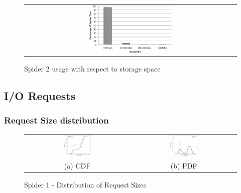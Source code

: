 \begin{figure}[!thb]
\begin{center}
\begin{tabular}{c}
{\includegraphics[width=0.40\textwidth]{./figs/storageUsage.eps}}\\
\end{tabular}
\vspace{-0.1in}
\caption{Spider 2 usage with respect to storage space}
\label{fig:storageUsage}
\end{center}
\end{figure}


\subsection{I/O Requests}
\subsubsection{Request Size distribution}



\begin{figure}[!t]
\begin{center}
\begin{tabular}{cc}
\hspace*{-1cm}                                                           
{\includegraphics[width=0.27\textwidth]{./figs/spider1-reqSizeCDF.eps}}&
\hspace{-2mm}
{\includegraphics[width=0.27\textwidth]{./figs/spider1-reqSizePDF.eps}}\\
\small (a) CDF & \small(b) PDF \\
\end{tabular}
\vspace{-0.1in}
\captionsetup{justification=centering}
\caption{Spider 1 - Distribution of Request Sizes}
\label{fig:spider1-reqsizedist}
\end{center}
\end{figure}

